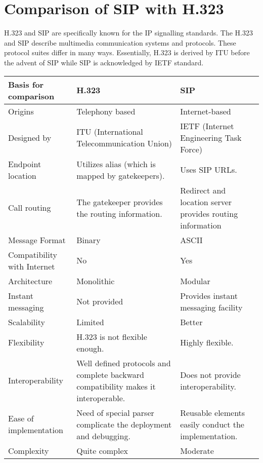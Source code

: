 \documentclass[12pt]{Book}
\begin{document}
    \section{Comparison of SIP with H.323}
    H.323 and SIP are specifically known for the IP signalling standards. The H.323 and SIP describe multimedia communication systems and protocols. These protocol suites differ in many ways. Essentially, H.323 is derived by ITU before the advent of SIP while SIP is acknowledged by IETF standard.
    \newpage
    \begin{center}
    \begin{tabular}{||m{8em}| m{10em} m{10em}||}
    \hline
    \hline
    Basis for comparison & H.323 & SIP \\ [0.5ex]
    \hline
    Origins	& Telephony based	& Internet-based \\
    \hline
Designed by &	ITU (International Telecommunication Union)	& IETF (Internet Engineering Task Force)\\ [2ex]
	\hline
	Endpoint location &	Utilizes alias (which is mapped by gatekeepers). &	Uses SIP URLs.\\
	\hline
	Call routing	& The gatekeeper provides the routing information.	& Redirect and location server provides routing information \\
	\hline
Message Format &	Binary &	ASCII\\
\hline
Compatibility with Internet	& No & 	Yes\\
\hline
Architecture &	Monolithic &	Modular\\
\hline
Instant messaging &	Not provided &	Provides instant messaging facility\\
\hline
Scalability &	Limited &	Better\\
\hline
Flexibility &	H.323 is not flexible enough. &	Highly flexible.\\
\hline
Interoperability &	Well defined protocols and complete backward compatibility makes it interoperable. &	Does not provide interoperability. \\
\hline
Ease of implementation &	Need of special parser complicate the deployment and debugging. &	Reusable elements easily conduct the implementation.\\
\hline
Complexity &	Quite complex &	Moderate	\\
    \hline    
    \hline
    \end{tabular}
    \end{center}
    \newpage\phantom{blabla}
    \newpage\phantom{blabla}
\end{document}
